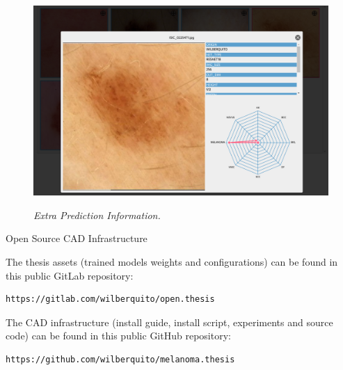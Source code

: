 \documentclass[dvipsnames,mathserif]{beamer}
\begin{document}
{\begin{frame}
\begin{figure}[H]
  \centering
  \begin{adjustbox}{width=0.7\textwidth, trim={0.05cm 0cm 0.25cm 0cm}, clip}
    \includegraphics[]{images/extra-inf-popup.png}
  \end{adjustbox}
  \caption[Extra Prediction Information]{\textit{Extra Prediction Information.}}
  {\label{fig:extra-inf-popup}}
\end{figure}

    \end{frame}


    \begin{frame}[fragile]


      \large Open Source CAD Infrastructure
      \vspace{0.25cm}

      \footnotesize

      The thesis assets (trained models weights and configurations) can be found in
      this public GitLab repository:

      \vspace{0.1cm}

      \begin{Verbatim}[fontsize=\tiny]
https://gitlab.com/wilberquito/open.thesis
      \end{Verbatim}

      The CAD infrastructure (install guide, install script, experiments and source code) can be found in
      this public GitHub repository:

      \vspace{0.1cm}

      \begin{Verbatim}[fontsize=\tiny]
https://github.com/wilberquito/melanoma.thesis
      \end{Verbatim}


\end{frame}}
\end{document}
